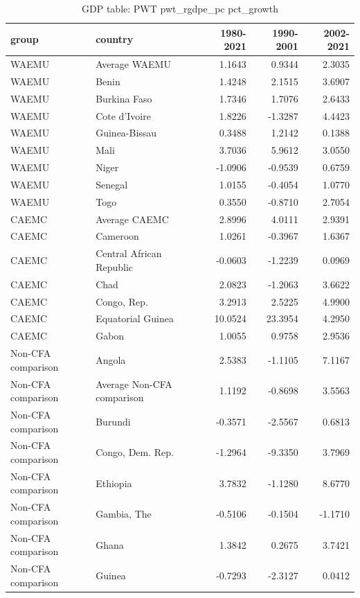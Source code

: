 \begin{table}

\caption{GDP table: PWT pwt_rgdpe_pc pct_growth}
\centering
\begin{tabular}[t]{llrrr}
\toprule
group & country & 1980-2021 & 1990-2001 & 2002-2021\\
\midrule
WAEMU & Average WAEMU & 1.1643 & 0.9344 & 2.3035\\
WAEMU & Benin & 1.4248 & 2.1515 & 3.6907\\
WAEMU & Burkina Faso & 1.7346 & 1.7076 & 2.6433\\
WAEMU & Cote d'Ivoire & 1.8226 & -1.3287 & 4.4423\\
WAEMU & Guinea-Bissau & 0.3488 & 1.2142 & 0.1388\\
\addlinespace
WAEMU & Mali & 3.7036 & 5.9612 & 3.0550\\
WAEMU & Niger & -1.0906 & -0.9539 & 0.6759\\
WAEMU & Senegal & 1.0155 & -0.4054 & 1.0770\\
WAEMU & Togo & 0.3550 & -0.8710 & 2.7054\\
CAEMC & Average CAEMC & 2.8996 & 4.0111 & 2.9391\\
\addlinespace
CAEMC & Cameroon & 1.0261 & -0.3967 & 1.6367\\
CAEMC & Central African Republic & -0.0603 & -1.2239 & 0.0969\\
CAEMC & Chad & 2.0823 & -1.2063 & 3.6622\\
CAEMC & Congo, Rep. & 3.2913 & 2.5225 & 4.9900\\
CAEMC & Equatorial Guinea & 10.0524 & 23.3954 & 4.2950\\
\addlinespace
CAEMC & Gabon & 1.0055 & 0.9758 & 2.9536\\
Non-CFA comparison & Angola & 2.5383 & -1.1105 & 7.1167\\
Non-CFA comparison & Average Non-CFA comparison & 1.1192 & -0.8698 & 3.5563\\
Non-CFA comparison & Burundi & -0.3571 & -2.5567 & 0.6813\\
Non-CFA comparison & Congo, Dem. Rep. & -1.2964 & -9.3350 & 3.7969\\
\addlinespace
Non-CFA comparison & Ethiopia & 3.7832 & -1.1280 & 8.6770\\
Non-CFA comparison & Gambia, The & -0.5106 & -0.1504 & -1.1710\\
Non-CFA comparison & Ghana & 1.3842 & 0.2675 & 3.7421\\
Non-CFA comparison & Guinea & -0.7293 & -2.3127 & 0.0412\\

\end{tabular}
\end{table}
